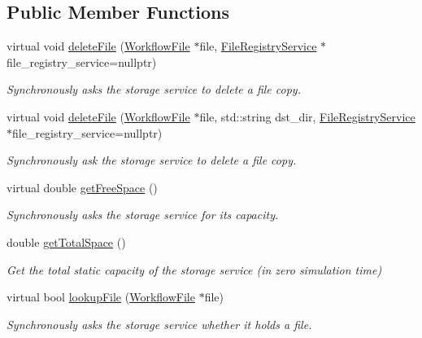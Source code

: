 \subsection*{Public Member Functions}
\begin{DoxyCompactItemize}
\item 
virtual void \hyperlink{classwrench_1_1_storage_service_a49becac571e80a1a89f2466cad3fc084}{delete\+File} (\hyperlink{classwrench_1_1_workflow_file}{Workflow\+File} $\ast$file, \hyperlink{classwrench_1_1_file_registry_service}{File\+Registry\+Service} $\ast$file\+\_\+registry\+\_\+service=nullptr)
\begin{DoxyCompactList}\small\item\em Synchronously asks the storage service to delete a file copy. \end{DoxyCompactList}\item 
virtual void \hyperlink{classwrench_1_1_storage_service_abc410d2a2155aaa78bea3c38209dcc37}{delete\+File} (\hyperlink{classwrench_1_1_workflow_file}{Workflow\+File} $\ast$file, std\+::string dst\+\_\+dir, \hyperlink{classwrench_1_1_file_registry_service}{File\+Registry\+Service} $\ast$file\+\_\+registry\+\_\+service=nullptr)
\begin{DoxyCompactList}\small\item\em Synchronously ask the storage service to delete a file copy. \end{DoxyCompactList}\item 
virtual double \hyperlink{classwrench_1_1_storage_service_a600a2fc0da8e1c5f1159509f09c2f2f6}{get\+Free\+Space} ()
\begin{DoxyCompactList}\small\item\em Synchronously asks the storage service for its capacity. \end{DoxyCompactList}\item 
double \hyperlink{classwrench_1_1_storage_service_a0ea24bcd9b320bde776b64dd8e4cd494}{get\+Total\+Space} ()
\begin{DoxyCompactList}\small\item\em Get the total static capacity of the storage service (in zero simulation time) \end{DoxyCompactList}\item 
virtual bool \hyperlink{classwrench_1_1_storage_service_aa0880c02e803fad5f2b467c91b520519}{lookup\+File} (\hyperlink{classwrench_1_1_workflow_file}{Workflow\+File} $\ast$file)
\begin{DoxyCompactList}\small\item\em Synchronously asks the storage service whether it holds a file. \end{DoxyCompactList}\item 

\end{DoxyCompactItemize}
